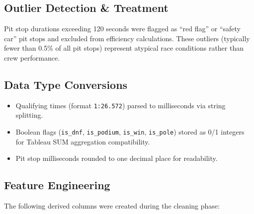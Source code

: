 \documentclass[12pt, a4paper]{article}
\begin{document}
\subsection{Outlier Detection \& Treatment}
Pit stop durations exceeding 120 seconds were flagged as ``red flag'' or ``safety car'' pit stops and excluded from efficiency calculations. These outliers (typically fewer than 0.5\% of all pit stops) represent atypical race conditions rather than crew performance.

\subsection{Data Type Conversions}
\begin{itemize}[noitemsep]
    \item Qualifying times (format \texttt{1:26.572}) parsed to milliseconds via string splitting.
    \item Boolean flags (\texttt{is\_dnf}, \texttt{is\_podium}, \texttt{is\_win}, \texttt{is\_pole}) stored as 0/1 integers for Tableau SUM aggregation compatibility.
    \item Pit stop milliseconds rounded to one decimal place for readability.
\end{itemize}

\subsection{Feature Engineering}
The following derived columns were created during the cleaning phase:
\end{document}
